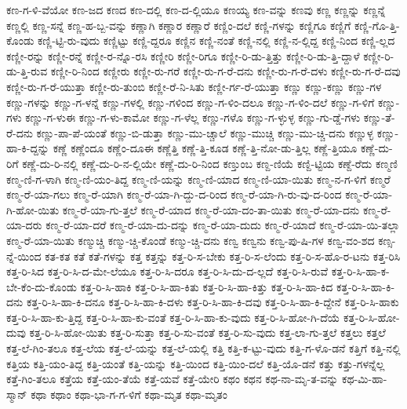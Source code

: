 {ಕಣ-ಗ-ಳಿ-ವೆಯೋ
ಕಣ-ಜದ
ಕಣದ
ಕಣ-ದಲ್ಲಿ
ಕಣ-ದ-ಲ್ಲಿಯೂ
ಕಣಯ್ಯ
ಕಣ-ವನ್ನು
ಕಣವು
ಕಣ್ಣ
ಕಣ್ಣನ್ನು
ಕಣ್ಣನ್ನೆ
ಕಣ್ಣಲ್ಲಿ
ಕಣ್ಣ-ಸನ್ನೆ
ಕಣ್ಣ-ಹ-ಬ್ಬ-ವನ್ನು
ಕಣ್ಣಾಗಿ
ಕಣ್ಣಾರ
ಕಣ್ಣಾರೆ
ಕಣ್ಣಿಂ-ದಲೆ
ಕಣ್ಣಿ-ಗಳನ್ನು
ಕಣ್ಣಿಗೂ
ಕಣ್ಣಿಗೆ
ಕಣ್ಣಿ-ಗೊ-ತ್ತಿ-ಕೊಂಡು
ಕಣ್ಣಿ-ಟ್ಟಿ-ರು-ವುದು
ಕಣ್ಣಿಟ್ಟು
ಕಣ್ಣಿ-ದ್ದರೂ
ಕಣ್ಣಿನ
ಕಣ್ಣಿ-ನಂತೆ
ಕಣ್ಣಿ-ನಲ್ಲಿ
ಕಣ್ಣಿ-ನ-ಲ್ಲಿದ್ದ
ಕಣ್ಣಿ-ನಿಂದ
ಕಣ್ಣಿ-ಲ್ಲದ
ಕಣ್ಣೀ-ರನ್ನು
ಕಣ್ಣೀ-ರನ್ನೆ
ಕಣ್ಣೀ-ರ-ನ್ನೊ-ರಸಿ
ಕಣ್ಣೀರಿ
ಕಣ್ಣೀ-ರಿಗೂ
ಕಣ್ಣೀ-ರಿ-ಡು-ತ್ತಿತ್ತು
ಕಣ್ಣೀ-ರಿ-ಡು-ತ್ತಿ-ದ್ದಾಳೆ
ಕಣ್ಣೀ-ರಿ-ಡು-ತ್ತಿ-ರುವ
ಕಣ್ಣೀ-ರಿ-ನಿಂದ
ಕಣ್ಣೀರು
ಕಣ್ಣೀ-ರು-ಗರೆ
ಕಣ್ಣೀ-ರು-ಗ-ರೆ-ದನು
ಕಣ್ಣೀ-ರು-ಗ-ರೆ-ದಳು
ಕಣ್ಣೀ-ರು-ಗ-ರೆ-ದವು
ಕಣ್ಣೀ-ರು-ಗ-ರೆ-ಯುತ್ತಾ
ಕಣ್ಣೀ-ರು-ತುಂಬಿ
ಕಣ್ಣೀ-ರೆ-ನಿ-ಸಿತು
ಕಣ್ಣೀ-ರ್ಗ-ರೆ-ಯುತ್ತಾ
ಕಣ್ಣು
ಕಣ್ಣು-ಕಣ್ಣು
ಕಣ್ಣು-ಗಳ
ಕಣ್ಣು-ಗಳನ್ನು
ಕಣ್ಣು-ಗ-ಳನ್ನೆ
ಕಣ್ಣು-ಗಳಲ್ಲಿ
ಕಣ್ಣು-ಗಳಿಂದ
ಕಣ್ಣು-ಗ-ಳಿಂ-ದಲೂ
ಕಣ್ಣು-ಗ-ಳಿಂ-ದಲೆ
ಕಣ್ಣು-ಗ-ಳಿಗೆ
ಕಣ್ಣು-ಗಳು
ಕಣ್ಣು-ಗ-ಳುಈ
ಕಣ್ಣು-ಗ-ಳು-ಕಾಮೋ
ಕಣ್ಣು-ಗ-ಳೆಲ್ಲ
ಕಣ್ಣು-ಗಳೊ
ಕಣ್ಣು-ಗ-ಳ್ಳುಳ್ಳ
ಕಣ್ಣು-ಗು-ಡ್ಡೆ-ಗಳು
ಕಣ್ಣು-ತೆ-ರೆ-ದನು
ಕಣ್ಣು-ಪಾ-ಪೆ-ಯಂತೆ
ಕಣ್ಣು-ಬಿ-ಡುತ್ತಾ
ಕಣ್ಣು-ಮು-ಚ್ಚಾಲೆ
ಕಣ್ಣು-ಮುಚ್ಚಿ
ಕಣ್ಣು-ಮು-ಚ್ಚಿ-ದನು
ಕಣ್ಣುಳ್ಳ
ಕಣ್ಣು-ಹಾ-ಕಿ-ದ್ದನ್ನು
ಕಣ್ಣೆ
ಕಣ್ಣೆಂದೂ
ಕಣ್ಣೆಂ-ದೂಈ
ಕಣ್ಣೆತ್ತಿ
ಕಣ್ಣೆ-ತ್ತಿ-ಕೂಡ
ಕಣ್ಣೆ-ತ್ತಿ-ನೋ-ಡು-ತ್ತಿಲ್ಲ
ಕಣ್ಣೆ-ತ್ತಿಯೂ
ಕಣ್ಣೆ-ದು-ರಿಗೆ
ಕಣ್ಣೆ-ದು-ರಿ-ನಲ್ಲಿ
ಕಣ್ಣೆ-ದು-ರಿ-ನ-ಲ್ಲಿಯೇ
ಕಣ್ಣೆ-ದು-ರಿ-ನಿಂದ
ಕಣ್ತುಂಬ
ಕಣ್ದ-ಣಿಯೆ
ಕಣ್ದಿ-ಟ್ಟಿಯ
ಕಣ್ದೆ-ರೆದು
ಕಣ್ಮಣಿ
ಕಣ್ಮ-ಣಿ-ಗ-ಳಾಗಿ
ಕಣ್ಮ-ಣಿ-ಯಂ-ತಿದ್ದ
ಕಣ್ಮ-ಣಿ-ಯನ್ನು
ಕಣ್ಮ-ಣಿ-ಯಾದ
ಕಣ್ಮ-ಣಿ-ಯಾ-ಯಿತು
ಕಣ್ಮ-ನ-ಗ-ಳಿಗೆ
ಕಣ್ಮರೆ
ಕಣ್ಮ-ರೆ-ಯಾ-ಗಲು
ಕಣ್ಮ-ರೆ-ಯಾಗಿ
ಕಣ್ಮ-ರೆ-ಯಾ-ಗಿ-ದ್ದು-ದ-ರಿಂದ
ಕಣ್ಮ-ರೆ-ಯಾ-ಗಿ-ರು-ವು-ದ-ರಿಂದ
ಕಣ್ಮ-ರೆ-ಯಾ-ಗಿ-ಹೋ-ಯಿತು
ಕಣ್ಮ-ರೆ-ಯಾ-ಗು-ತ್ತಲೆ
ಕಣ್ಮ-ರೆ-ಯಾದ
ಕಣ್ಮ-ರೆ-ಯಾ-ದಂ-ತಾ-ಯಿತು
ಕಣ್ಮ-ರೆ-ಯಾ-ದನು
ಕಣ್ಮ-ರೆ-ಯಾ-ದರು
ಕಣ್ಮ-ರೆ-ಯಾ-ದರೆ
ಕಣ್ಮ-ರೆ-ಯಾ-ದು-ದನ್ನು
ಕಣ್ಮ-ರೆ-ಯಾ-ದುದು
ಕಣ್ಮ-ರೆ-ಯಾದೆ
ಕಣ್ಮ-ರೆ-ಯಾ-ಯಿ-ತಲ್ಲಾ
ಕಣ್ಮ-ರೆ-ಯಾ-ಯಿತು
ಕಣ್ಮುಚ್ಚಿ
ಕಣ್ಮು-ಚ್ಚಿ-ಕೊಂಡೆ
ಕಣ್ಮು-ಚ್ಚಿ-ದನು
ಕಣ್ವ
ಕಣ್ವನು
ಕಣ್ವ-ಪು-ಷಿ-ಗಳ
ಕಣ್ವ-ವಂ-ಶದ
ಕಣ್ಸ-ನ್ನೆ-ಯಿಂದ
ಕತ-ಕತ
ಕತೆ
ಕತೆ-ಗಳನ್ನು
ಕತ್ತ
ಕತ್ತನ್ನು
ಕತ್ತ-ರಿ-ಸ-ಬೇಕು
ಕತ್ತ-ರಿ-ಸ-ಲೆಂದು
ಕತ್ತ-ರಿ-ಸ-ಹೊ-ರ-ಟನು
ಕತ್ತ-ರಿಸಿ
ಕತ್ತ-ರಿ-ಸಿದ
ಕತ್ತ-ರಿ-ಸಿ-ದ-ಮೇ-ಲೆಯೂ
ಕತ್ತ-ರಿ-ಸಿ-ದರೂ
ಕತ್ತ-ರಿ-ಸಿ-ದು-ದ-ಲ್ಲದೆ
ಕತ್ತ-ರಿ-ಸಿ-ರುವೆ
ಕತ್ತ-ರಿ-ಸಿ-ಹಾ-ಕ-ಬೇ-ಕೆಂ-ದು-ಕೊಂಡು
ಕತ್ತ-ರಿ-ಸಿ-ಹಾಕಿ
ಕತ್ತ-ರಿ-ಸಿ-ಹಾ-ಕಿತು
ಕತ್ತ-ರಿ-ಸಿ-ಹಾ-ಕಿತ್ತು
ಕತ್ತ-ರಿ-ಸಿ-ಹಾ-ಕಿದ
ಕತ್ತ-ರಿ-ಸಿ-ಹಾ-ಕಿ-ದನು
ಕತ್ತ-ರಿ-ಸಿ-ಹಾ-ಕಿ-ದನೂ
ಕತ್ತ-ರಿ-ಸಿ-ಹಾ-ಕಿ-ದಳು
ಕತ್ತ-ರಿ-ಸಿ-ಹಾ-ಕಿ-ದವು
ಕತ್ತ-ರಿ-ಸಿ-ಹಾ-ಕಿ-ದ್ದೇನೆ
ಕತ್ತ-ರಿ-ಸಿ-ಹಾಕು
ಕತ್ತ-ರಿ-ಸಿ-ಹಾ-ಕು-ತ್ತಿದ್ದ
ಕತ್ತ-ರಿ-ಸಿ-ಹಾ-ಕು-ವಂತೆ
ಕತ್ತ-ರಿ-ಸಿ-ಹಾ-ಕು-ವುದು
ಕತ್ತ-ರಿ-ಸಿ-ಹೋ-ಗಿ-ದೆಯೆ
ಕತ್ತ-ರಿ-ಸಿ-ಹೋ-ದುವು
ಕತ್ತ-ರಿ-ಸಿ-ಹೋ-ಯಿತು
ಕತ್ತ-ರಿ-ಸುತ್ತಾ
ಕತ್ತ-ರಿ-ಸು-ವಂತೆ
ಕತ್ತ-ರಿ-ಸು-ವುದು
ಕತ್ತ-ಲಾ-ಗು-ತ್ತಲೆ
ಕತ್ತಲು
ಕತ್ತಲೆ
ಕತ್ತ-ಲೆ-ಗಿಂ-ತಲೂ
ಕತ್ತ-ಲೆಯ
ಕತ್ತ-ಲೆ-ಯನ್ನು
ಕತ್ತ-ಲೆ-ಯಲ್ಲಿ
ಕತ್ತಿ
ಕತ್ತಿ-ಕ-ಟ್ಟು-ವುದು
ಕತ್ತಿ-ಗ-ಳೊ-ಡನೆ
ಕತ್ತಿಗೆ
ಕತ್ತಿ-ನಲ್ಲಿ
ಕತ್ತಿಯ
ಕತ್ತಿ-ಯಂ-ತಿದ್ದ
ಕತ್ತಿ-ಯಂತೆ
ಕತ್ತಿ-ಯನ್ನು
ಕತ್ತಿ-ಯಿಂದ
ಕತ್ತಿ-ಯಿಂ-ದಲೆ
ಕತ್ತಿ-ಯೊ-ಡನೆ
ಕತ್ತು
ಕತ್ತು-ಗಳನ್ನೆಲ್ಲ
ಕತ್ತೆ-ಗಿಂ-ತಲೂ
ಕತ್ತೆಯ
ಕತ್ತೆ-ಯಂ-ತೆಯೆ
ಕತ್ತೆ-ಯವೆ
ಕತ್ತೆ-ಯೇರಿ
ಕಥಂ
ಕಥನ
ಕಥ-ನಾ-ಮೃ-ತ-ವನ್ನು
ಕಥ-ಮಿ-ಹಾ-ಸ್ಮಾನ್
ಕಥಾ
ಕಥಾಂ
ಕಥಾ-ಭಾ-ಗ-ಗ-ಳಿಗೆ
ಕಥಾ-ಮೃತ
ಕಥಾ-ಮೃತಂ
}
